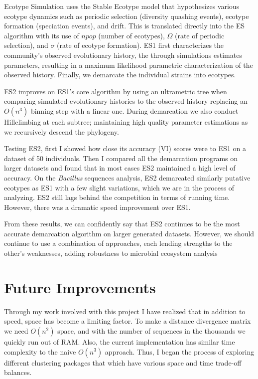 Ecotype Simulation uses the Stable Ecotype model that hypothesizes various ecotype dynamics such as periodic selection (diversity quashing events), ecotype formation (speciation events), and drift.
This is translated directly into the ES algorithm with its use of $npop$ (number of ecotypes), $\Omega$ (rate of periodic selection), and $\sigma$ (rate of ecotype formation).
ES1 first characterizes the community's observed evolutionary history, the through simulations estimates parameters, resulting in a maximum likelihood parametric characterization of the observed history.
Finally, we demarcate the individual strains into ecotypes.

ES2 improves on ES1's core algorithm by using an ultrametric tree when comparing simulated evolutionary histories to the observed history replacing an $O(n^3)$ binning step with a linear one.
During demarcation we also conduct Hillclimbing at each subtree; maintaining high quality parameter estimations as we recursively descend the phylogeny.

Testing ES2, first I showed how close its accuracy (VI) scores were to ES1 on a dataset of 50 individuals.
Then I compared all the demarcation programs on larger datasets and found that in most cases ES2 maintained a high level of accuracy.
On the \emph{Bacillus} sequences analysis, ES2 demarcated similarly putative ecotypes as ES1 with a few slight variations, which we are in the process of analyzing.
ES2 still lags behind the competition in terms of running time.
However, there was a dramatic speed improvement over ES1.

From these results, we can confidently say that ES2 continues to be the most accurate demarcation algorithm on larger generated datasets. However, we should continue to use a combination of approaches, each lending strengths to the other's weaknesses, adding robustness to microbial ecosystem analysis~\cite{bohannan2003new}



\section{Future Improvements}
Through my work involved with this project I have realized that in addition to speed, space has become a limiting factor.
To make a distance divergence matrix we need $O(n^2)$ space, and with the number of sequences in the thousands we quickly run out of RAM.
Also, the current implementation has similar time complexity to the naive $O(n^3)$ approach.
Thus, I began the process of exploring different clustering packages that which have various space and time trade-off balances.

